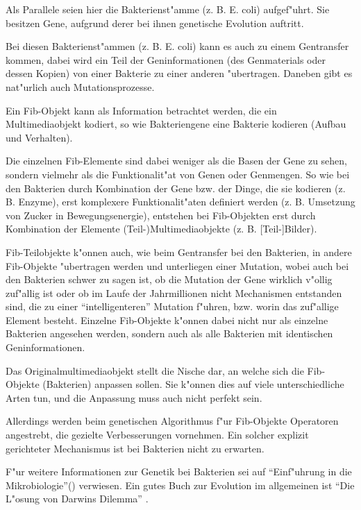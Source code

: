 Als Parallele seien hier die Bakterienst"amme (z. B. E. coli) aufgef"uhrt. Sie besitzen Gene, aufgrund derer bei ihnen genetische Evolution auftritt.

Bei diesen Bakterienst"ammen (z. B. E. coli) kann es auch zu einem Gentransfer kommen, dabei wird ein Teil der Geninformationen (des Genmaterials oder dessen Kopien) von einer Bakterie zu einer anderen "ubertragen. Daneben gibt es nat"urlich auch Mutationsprozesse.

Ein Fib-Objekt kann als Information betrachtet werden, die ein Multimediaobjekt kodiert, so wie Bakteriengene eine Bakterie kodieren (Aufbau und Verhalten).

Die einzelnen Fib-Elemente sind dabei weniger als die Basen der Gene zu sehen, sondern vielmehr als die Funktionalit"at von Genen oder Genmengen. So wie bei den Bakterien durch Kombination der Gene bzw. der Dinge, die sie kodieren (z. B. Enzyme), erst komplexere Funktionalit"aten definiert werden (z. B. Umsetzung von Zucker in Bewegungsenergie), entstehen bei Fib-Objekten erst durch Kombination der Elemente (Teil-)Multimediaobjekte (z. B. [Teil-]Bilder).

Fib-Teilobjekte k"onnen auch, wie beim Gentransfer bei den Bakterien, in andere Fib-Objekte "ubertragen werden und unterliegen einer Mutation, wobei auch bei den Bakterien schwer zu sagen ist, ob die Mutation der Gene wirklich v"ollig zuf"allig ist oder ob im Laufe der Jahrmillionen nicht Mechanismen entstanden sind, die zu einer ``intelligenteren'' Mutation f"uhren, bzw. worin das zuf"allige Element besteht. Einzelne Fib-Objekte k"onnen dabei nicht nur als einzelne Bakterien angesehen werden, sondern auch als alle Bakterien mit identischen Geninformationen.

Das Originalmultimediaobjekt stellt die Nische dar, an welche sich die Fib-Objekte (Bakterien) anpassen sollen. Sie k"onnen dies auf viele unterschiedliche Arten tun, und die Anpassung muss auch nicht perfekt sein.

Allerdings werden beim genetischen Algorithmus f"ur Fib-Objekte Operatoren angestrebt, die gezielte Verbesserungen vornehmen. Ein solcher explizit gerichteter Mechanismus ist bei Bakterien nicht zu erwarten.

F"ur weitere Informationen zur Genetik bei Bakterien sei auf ``Einf"uhrung in die Mikrobiologie''(\cite{genTrans}) verwiesen. Ein gutes Buch zur Evolution im allgemeinen ist ``Die L"osung von Darwins Dilemma'' \cite{LDD_2007} .
















